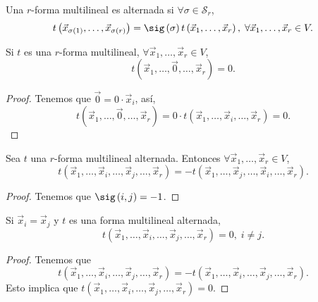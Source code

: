 \begin{fdefinition}[]
\normalfont Una $\displaystyle r $-forma multilineal es alternada si $\displaystyle \forall \sigma \in \mathcal{S}_{r} $, 
\[t\left(\vec{x}_{\sigma\left(1\right)}, \ldots, \vec{x}_{\sigma\left(r\right)}\right) = \sig\left(\sigma \right)t\left(\vec{x}_{1}, \ldots, \vec{x}_{r}\right), \; \forall \vec{x}_{1}, \ldots, \vec{x}_{r} \in V .\]
\end{fdefinition}

\begin{fprop}[]
\normalfont Si $\displaystyle t $ es una $\displaystyle r $-forma multilineal, $\displaystyle \forall \vec{x}_{1}, \ldots, \vec{x}_{r} \in V $,
\[t\left(\vec{x}_{1}, \ldots, \vec{0}, \ldots, \vec{x}_{r}\right) = 0 .\]
\end{fprop}
\begin{proof} Tenemos que $\displaystyle \vec{0} = 0 \cdot \vec{x}_{i}  $, así, 
\[t\left(\vec{x}_{1}, \ldots, \vec{0}, \ldots, \vec{x}_{r}\right) =0 \cdot t\left(\vec{x}_{1}, \ldots, \vec{x}_{i}, \ldots, \vec{x}_{r}\right) = 0.\]
\end{proof}

\begin{fprop}[]
\normalfont Sea $\displaystyle t $ una $\displaystyle r $-forma multilineal alternada. Entonces $\displaystyle \forall \vec{x}_{1}, \ldots, \vec{x}_{r} \in V $,
\[t\left(\vec{x}_{1}, \ldots, \vec{x}_{i}, \ldots, \vec{x}_{j}, \ldots, \vec{x}_{r}\right) = -t\left(\vec{x}_{1}, \ldots, \vec{x}_{j}, \ldots, \vec{x}_{i}, \ldots, \vec{x}_{r}\right) .\]
\end{fprop}

\begin{proof}
Tenemos que $\displaystyle \sig\left(i,j\right) = -1 $.
\end{proof}

\begin{fprop}[]
\normalfont Si $\displaystyle \vec{x}_{i} = \vec{x}_{j} $ y $\displaystyle t $ es una forma multilineal alternada,
\[t\left(\vec{x}_{1}, \ldots, \vec{x}_{i}, \ldots, \vec{x}_{j}, \ldots, \vec{x}_{r}\right) = 0, \; i \neq j .\]
\end{fprop}
\begin{proof}
Tenemos que 
\[t\left(\vec{x}_{1}, \ldots, \vec{x}_{i}, \ldots, \vec{x}_{j}, \ldots, \vec{x}_{r}\right) = -t\left(\vec{x}_{1}, \ldots, \vec{x}_{i}, \ldots, \vec{x}_{j}, \ldots, \vec{x}_{r}\right) .\]
Esto implica que $\displaystyle t\left(\vec{x}_{1}, \ldots, \vec{x}_{i}, \ldots, \vec{x}_{j}, \ldots, \vec{x}_{r}\right) = 0 $.
\end{proof}

